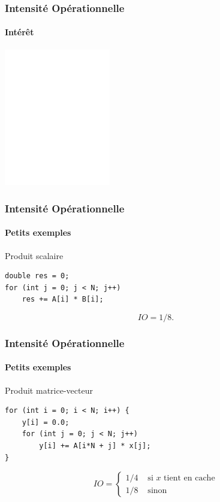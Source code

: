 \documentclass[xcolor={x11names,svgnames}, 14pt]{beamer}
\begin{document}
\begin{frame}
  \frametitle{Intensité Opérationnelle}
  \framesubtitle{Intérêt}
  
    \centering

  \includegraphics[height=6cm]{roofline_basic.pdf}
\end{frame}


\begin{frame}[fragile]
  \frametitle{Intensité Opérationnelle}
  \framesubtitle{Petits exemples}
  
  \begin{block}{Produit scalaire}
\begin{verbatim}
double res = 0;
for (int j = 0; j < N; j++)
    res += A[i] * B[i];
\end{verbatim}
  \end{block}

  \pause

  \bigskip

  \[
    IO = 1/8.
  \]  
\end{frame}


\begin{frame}[fragile]
  \frametitle{Intensité Opérationnelle}
  \framesubtitle{Petits exemples}
  
  \begin{block}{Produit matrice-vecteur}
\begin{verbatim}
for (int i = 0; i < N; i++) {
    y[i] = 0.0;
    for (int j = 0; j < N; j++)
        y[i] += A[i*N + j] * x[j];
}
\end{verbatim}
  \end{block}

  \pause

  \bigskip

  \[
    IO = \begin{cases}
      1 / 4 & \text{ si $x$ tient en cache} \\
      1 / 8 & \text{ sinon}
    \end{cases}
  \]  
\end{frame}
\end{document}
